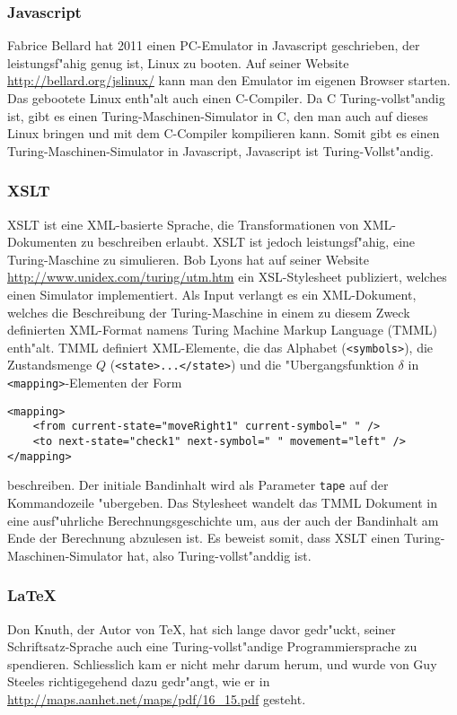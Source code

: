 \subsubsection{Javascript}
Fabrice Bellard hat 2011 einen PC-Emulator in Javascript geschrieben, der
leistungsf"ahig genug ist, Linux zu booten. Auf seiner Website
\url{http://bellard.org/jslinux/} kann man den Emulator im eigenen Browser
starten. Das gebootete Linux enth"alt auch einen C-Compiler. Da C
Turing-vollst"andig ist, gibt es einen Turing-Maschinen-Simulator in
C, den man auch auf dieses Linux bringen und mit dem C-Compiler
kompilieren kann. Somit gibt es einen Turing-Maschinen-Simulator in
Javascript, Javascript ist Turing-Vollst"andig.

\subsubsection{XSLT}
XSLT ist eine XML-basierte Sprache, die Transformationen von XML-Dokumenten
zu beschreiben erlaubt. XSLT ist jedoch leistungsf"ahig, eine Turing-Maschine
zu simulieren. Bob Lyons hat auf seiner Website
\url{http://www.unidex.com/turing/utm.htm} ein XSL-Stylesheet publiziert,
welches einen Simulator implementiert. Als Input verlangt es
ein
XML-Dokument, welches die Beschreibung der Turing-Maschine in einem
zu diesem Zweck definierten XML-Format namens Turing Machine Markup
Language (TMML) enth"alt. TMML definiert XML-Elemente, die das Alphabet
(\verb+<symbols>+),
die Zustandsmenge $Q$ (\verb+<state>...</state>+)
und die "Ubergangsfunktion $\delta$ in \verb+<mapping>+-Elementen
der Form
\begin{verbatim}
<mapping>
    <from current-state="moveRight1" current-symbol=" " />
    <to next-state="check1" next-symbol=" " movement="left" />
</mapping>
\end{verbatim}
beschreiben. Der initiale Bandinhalt wird als Parameter \verb+tape+
auf der Kommandozeile "ubergeben.
Das Stylesheet wandelt das TMML Dokument in eine ausf"uhrliche
Berechnungsgeschichte um, aus der auch der Bandinhalt am Ende der Berechnung
abzulesen ist. Es beweist somit, dass XSLT einen Turing-Maschinen-Simulator
hat, also Turing-vollst"anddig ist.

\subsubsection{\LaTeX}
Don Knuth, der Autor von \TeX, hat sich lange davor gedr"uckt, seiner
Schriftsatz-Sprache auch eine Turing-vollst"andige Programmiersprache
zu spendieren. Schliesslich kam er nicht mehr darum herum, und wurde
von Guy Steeles richtigegehend dazu gedr"angt, wie er in
\url{http://maps.aanhet.net/maps/pdf/16\_15.pdf}
gesteht.

